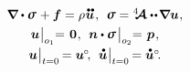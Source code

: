 

\thispagestyle{empty}

\label{chapter:vibrationsnwaves}



\label{section:vibrations.3dbodies}

   

\nopagebreak\vspace{-0.1em}\begin{equation}\label{classiclinearelasticity:problem}
\begin{array}{c}
\boldnabla \dotp \linearstress \hspace{.15ex} + \bm{f} = \rho \hspace{.1ex} \mathdotdotabove{\bm{u}} \hspace{.2ex} ,
\:\:
\linearstress = \stiffnesstensor \dotdotp \hspace{-0.25ex} \boldnabla {\bm{u}} \hspace{.1ex} ,
\\[.32em]
%
\bm{u} \hspace{.1ex} \bigr|_{o_1} \hspace{-0.64ex} = \hspace{.2ex} \zerovector \hspace{.1ex},
\:\:
\bm{n} \dotp \linearstress \hspace{0.25ex} \bigr|_{o_2} \hspace{-0.64ex} = \hspace{.2ex} \bm{p} \hspace{.16ex} ,
\\[.4em]
%
\bm{u} \hspace{.1ex} \bigr|_{t=0} \hspace{-0.2ex} = \bm{u}^{\hspace{-0.1ex}\circ} \hspace{-0.4ex},
\:\:
\mathdotabove{\bm{u}} \hspace{.1ex} \bigr|_{t=0} \hspace{-0.2ex} = \mathdotabove{\bm{u}}^{\circ} \hspace{-0.4ex} .
\end{array}
\end{equation}

